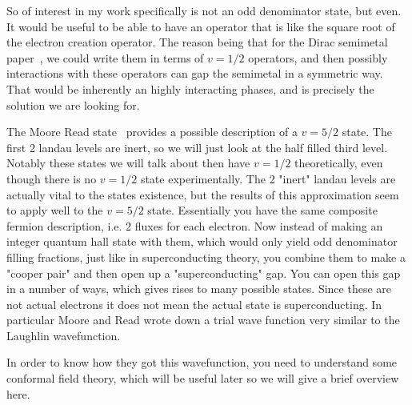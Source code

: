 So of interest in my work specifically is not an odd denominator state, but even. It would be useful to be able to have an operator that is like the square root of the electron creation operator. The reason being that for the Dirac semimetal paper~\cite{RazaSirotaTeo17}, we could write them in terms of $v=1/2$ operators, and then possibly interactions with these operators can gap the semimetal in a symmetric way. That would be inherently an highly interacting phases, and is precisely the solution we are looking for.

The Moore Read state~\cite{MooreRead,ReadMoore,GreiterWenWilczekPRL91,GreiterWenWilczek91} provides a possible description of a $v=5/2$ state. The first 2 landau levels are inert, so we will just look at the half filled third level. Notably these states we will talk about then have $v=1/2$ theoretically, even though there is no $v=1/2$ state experimentally. The 2 "inert" landau levels are actually vital to the states existence, but the results of this approximation seem to apply well to the $v=5/2$ state. Essentially you have the same composite fermion description, i.e. 2 fluxes for each electron. Now instead of making an integer quantum hall state with them, which would only yield odd denominator filling fractions, just like in superconducting theory, you combine them to make a "cooper pair" and then open up a "superconducting" gap. You can open this gap in a number of ways, which gives rises to many possible states. Since these are not actual electrons it does not mean the actual state is superconducting. In particular Moore and Read wrote down a trial wave function very similar to the Laughlin wavefunction.

In order to know how they got this wavefunction, you need to understand some conformal field theory, which will be useful later so we will give a brief overview here.

